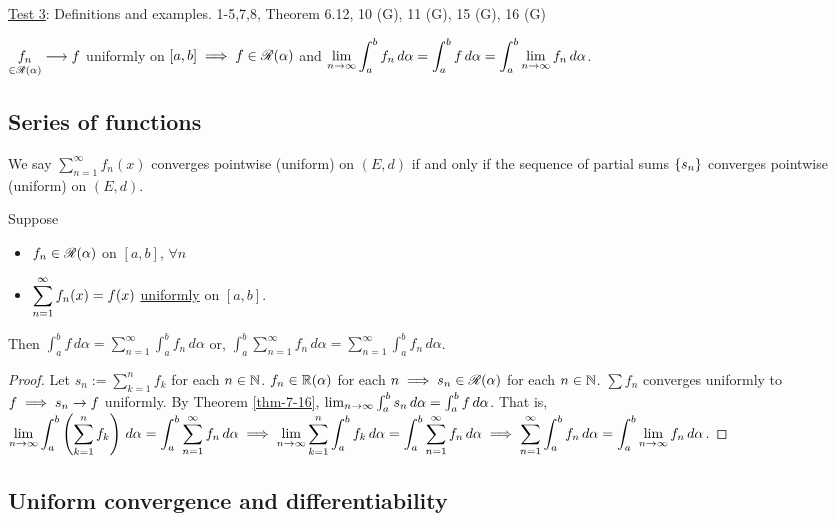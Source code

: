\documentclass[]{article}
\begin{document}
\ul{Test 3}: Definitions and examples. 1-5,7,8, Theorem 6.12, 10 (G), 11 (G), 15 (G), 16 (G)

\begin{recall}
	$\underset{\in\mathscr{R}(\alpha)}{f_n}\longrightarrow f$ uniformly on $[a,b] \implies f\in\mathscr{R}(\alpha)$ and $\displaystyle\lim_{n\rightarrow\infty} \int_a^b f_n\,d\alpha = \int_a^b f\,d\alpha = \int_a^b \lim_{n\rightarrow\infty} f_n\,d\alpha$.
\end{recall}

\subsection*{Series of functions}

We say $\sum_{n=1}^\infty f_n(x)$ converges pointwise (uniform) on $(E,d)$ if and only if the sequence of partial sums $\left\{ s_n \right\}$ converges pointwise (uniform) on $(E,d)$.

\begin{corollary}
	Suppose
	\begin{itemize}
		\item $f_n\in\mathscr{R}(\alpha)$ on $[a,b]$, $\forall n$
		\item $\displaystyle\sum_{n=1}^\infty f_n(x) = f(x)$ \ul{uniformly} on $[a,b]$.
	\end{itemize}
	Then $\int_a^b f\,d\alpha = \sum_{n=1}^\infty \int_a^b f_n\,d\alpha$ or, $\int_a^b \sum_{n=1}^\infty f_n\,d\alpha = \sum_{n=1}^\infty \int_a^b f_n\,d\alpha$.
\end{corollary}
\begin{proof}
	Let $s_n:= \sum_{k=1}^n f_k$ for each $n\in\mathbb{N}$.
	$f_n\in\mathbb{R}(\alpha)$ for each $n \implies s_n\in\mathscr{R}(\alpha)$ for each $n\in\mathbb{N}$.
	$\sum f_n$ converges uniformly to $f \implies s_n\rightarrow f$ uniformly.
	By Theorem \ref{thm-7-16}, $\lim_{n\rightarrow\infty} \int_a^b s_n\,d\alpha = \int_a^b f\,d\alpha$.
	That is, $\displaystyle\lim_{n\rightarrow\infty} \int_a^b \left(\sum_{k=1}^n f_k\right)\,d\alpha = \int_a^b \sum_{n=1}^\infty f_n\,d\alpha \implies \lim_{n\rightarrow\infty} \sum_{k=1}^n \int_a^b f_k\,d\alpha = \int_a^b \sum_{n=1}^\infty f_n\,d\alpha \implies \sum_{n=1}^\infty \int_a^b f_n\,d\alpha = \int_a^b \lim_{n\rightarrow\infty} f_n\,d\alpha$.
\end{proof}

\subsection*{Uniform convergence and differentiability}
\end{document}
